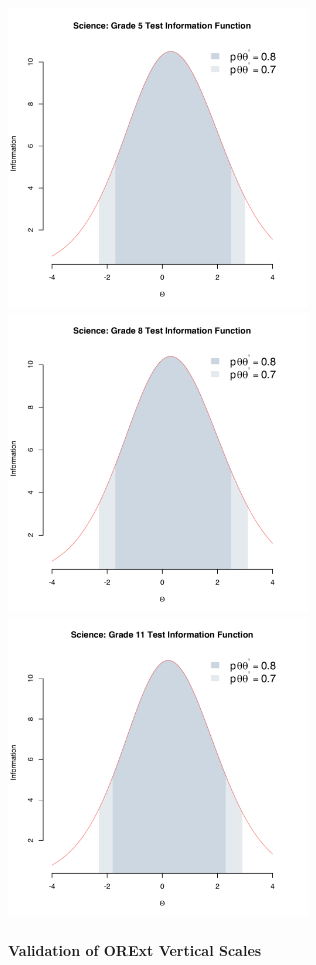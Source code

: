 \documentclass[]{article}
\let\oldparagraph\paragraph
\renewcommand{\paragraph}[1]{\oldparagraph{#1}\mbox{}}
\begin{document}
\FloatBarrier

\includegraphics[width=\textwidth,height=3.125in]{tifs/science5tif.pdf}
\includegraphics[width=\textwidth,height=3.125in]{tifs/science8tif.pdf}
\includegraphics[width=\textwidth,height=3.125in]{tifs/science11tif.pdf}

\hypertarget{validation-of-orext-vertical-scales}{%
\paragraph{Validation of ORExt Vertical
Scales}\label{validation-of-orext-vertical-scales}}
\end{document}
